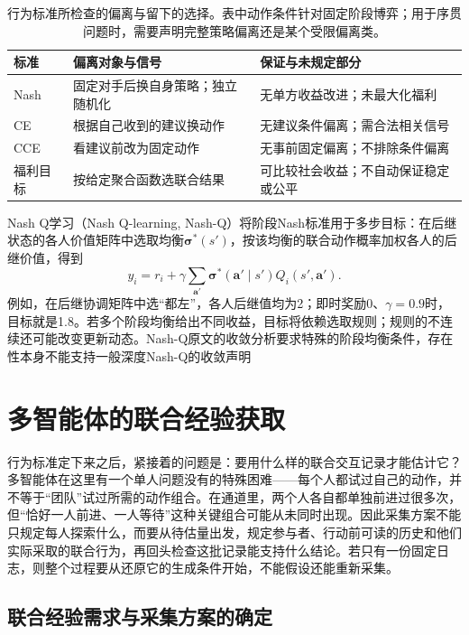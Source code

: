 \begin{table}[htbp]
 \centering
 \begin{tabularx}{\linewidth}{@{}l >{\raggedright\arraybackslash}X >{\raggedright\arraybackslash}X@{}}
 \toprule
 标准 & 偏离对象与信号 & 保证与未规定部分\\
 \midrule
 Nash & 固定对手后换自身策略；独立随机化 & 无单方收益改进；未最大化福利\\
 CE & 根据自己收到的建议换动作 & 无建议条件偏离；需合法相关信号\\
 CCE & 看建议前改为固定动作 & 无事前固定偏离；不排除条件偏离\\
 福利目标 & 按给定聚合函数选联合结果 & 可比较社会收益；不自动保证稳定或公平\\
 \bottomrule
 \end{tabularx}
 \caption{行为标准所检查的偏离与留下的选择。表中动作条件针对固定阶段博弈；用于序贯问题时，需要声明完整策略偏离还是某个受限偏离类。}
 \label{tab:rl-multi-agent-equilibria}
\end{table}

Nash Q学习（Nash Q-learning, Nash-Q）将阶段Nash标准用于多步目标：在后继状态的各人价值矩阵中选取均衡$\bm\sigma^*(s')$，按该均衡的联合动作概率加权各人的后继价值，得到
\[
 y_i=r_i+\gamma\sum_{\bm a'}\bm\sigma^*(\bm a'\mid s')
                         Q_i(s',\bm a').
\]
例如，在后继协调矩阵中选“都左”，各人后继值均为2；即时奖励0、$\gamma=0.9$时，目标就是1.8。若多个阶段均衡给出不同收益，目标将依赖选取规则；规则的不连续还可能改变更新动态。Nash-Q原文的收敛分析要求特殊的阶段均衡条件，存在性本身不能支持一般深度Nash-Q的收敛声明

\section{多智能体的联合经验获取}
\label{sec:rl-multi-agent-data}

行为标准定下来之后，紧接着的问题是：要用什么样的联合交互记录才能估计它？多智能体在这里有一个单人问题没有的特殊困难——每个人都试过自己的动作，并不等于“团队”试过所需的动作组合。在通道里，两个人各自都单独前进过很多次，但“恰好一人前进、一人等待”这种关键组合可能从未同时出现。因此采集方案不能只规定每人探索什么，而要从待估量出发，规定参与者、行动前可读的历史和他们实际采取的联合行为，再回头检查这批记录能支持什么结论。若只有一份固定日志，则整个过程要从还原它的生成条件开始，不能假设还能重新采集。

\subsection{联合经验需求与采集方案的确定}
\label{sec:rl-multi-agent-collection-plan}

